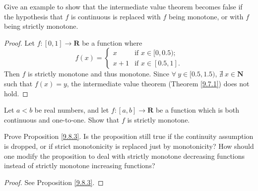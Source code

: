 \begin{exercise}\label{ex 9.8.2}
    Give an example to show that the intermediate value theorem becomes false if the hypothesis that \(f\) is continuous is replaced with \(f\) being monotone, or with \(f\) being strictly monotone.
\end{exercise}

\begin{proof}
    Let \(f : [0, 1] \to \mathbf{R}\) be a function where
    \[
        f(x) = \begin{cases}
            x & \text{if } x \in [0, 0.5); \\
            x + 1 & \text{if } x \in [0.5, 1].
        \end{cases}
    \]
    Then \(f\) is strictly monotone and thus monotone.
    Since \(\forall\ y \in [0.5, 1.5)\), \(\nexists\ x \in \mathbf{N}\) such that \(f(x) = y\), the intermediate value theorem (Theorem \ref{9.7.1}) does not hold.
\end{proof}

\begin{exercise}\label{ex 9.8.3}
    Let \(a < b\) be real numbers, and let \(f : [a, b] \to \mathbf{R}\) be a function which is both continuous and one-to-one.
    Show that \(f\) is strictly monotone.
\end{exercise}

\begin{exercise}\label{ex 9.8.4}
    Prove Proposition \ref{9.8.3}.
    Is the proposition still true if the continuity assumption is dropped, or if strict monotonicity is replaced just by monotonicity?
    How should one modify the proposition to deal with strictly monotone decreasing functions instead of strictly monotone increasing functions?
\end{exercise}

\begin{proof}
    See Proposition \ref{9.8.3}.
\end{proof}

